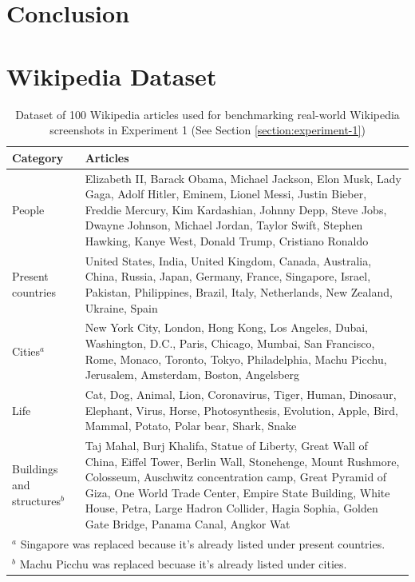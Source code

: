 \documentclass[12pt,oneside]{memoir}
\begin{document}
\chapter{Conclusion}

\printbibliography[title={References}]

\clearpage
\appendix
\renewcommand{\chaptername}{Appendix}

\chapter{Wikipedia Dataset}

\begin{table}[ht]
    \centering
    \caption{Dataset of 100 Wikipedia articles used for benchmarking real-world Wikipedia screenshots in Experiment 1 (See Section \ref{section:experiment-1})}
    \label{table:real-world-wikipedia-dataset}
    \begin{tabular}{p{1in}p{4.8in}}
        \toprule
        \textbf{Category} & \textbf{Articles} \\
        \midrule
        People & Elizabeth II, Barack Obama, Michael Jackson, Elon Musk, Lady Gaga, Adolf Hitler, Eminem, Lionel Messi, Justin Bieber, Freddie Mercury, Kim Kardashian, Johnny Depp, Steve Jobs, Dwayne Johnson, Michael Jordan, Taylor Swift, Stephen Hawking, Kanye West, Donald Trump, Cristiano Ronaldo\\
        \midrule
        Present countries & United States, India, United Kingdom, Canada, Australia, China, Russia, Japan, Germany, France, Singapore, Israel, Pakistan, Philippines, Brazil, Italy, Netherlands, New Zealand, Ukraine, Spain\\
        \midrule
        Cities$^a$ & New York City, London, Hong Kong, Los Angeles, Dubai, Washington, D.C., Paris, Chicago, Mumbai, San Francisco, Rome, Monaco, Toronto, Tokyo, Philadelphia, Machu Picchu, Jerusalem, Amsterdam, Boston, Angelsberg\\
        \midrule
        Life & Cat, Dog, Animal, Lion, Coronavirus, Tiger, Human, Dinosaur, Elephant, Virus, Horse, Photosynthesis, Evolution, Apple, Bird, Mammal, Potato, Polar bear, Shark, Snake\\
        \midrule
        Buildings and structures$^b$ & Taj Mahal, Burj Khalifa, Statue of Liberty, Great Wall of China, Eiffel Tower, Berlin Wall, Stonehenge, Mount Rushmore, Colosseum, Auschwitz concentration camp, Great Pyramid of Giza, One World Trade Center, Empire State Building, White House, Petra, Large Hadron Collider, Hagia Sophia, Golden Gate Bridge, Panama Canal, Angkor Wat\\
        \bottomrule
        \multicolumn{2}{l}{\footnotesize $^a$ Singapore was replaced because it's already listed under present countries.}\\
        \multicolumn{2}{l}{\footnotesize $^b$ Machu Picchu was replaced becuase it's already listed under cities.}
    \end{tabular}
\end{table}
\end{document}

